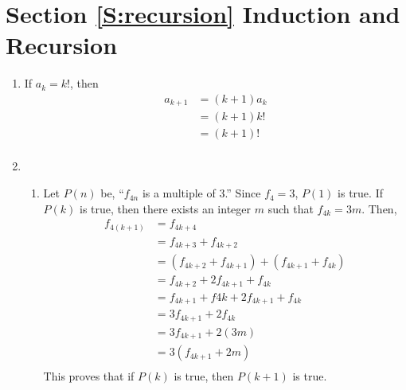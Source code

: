 \section*{Section \ref{S:recursion} Induction and Recursion}

\begin{enumerate}
\item  If  $a_k = k!$, then
\begin{align*}
a_{k+1} &= \left( k + 1 \right)a_k \\
        &= \left( k + 1 \right) k! \\
        &= \left( k + 1 \right)! \\
\end{align*}







\item
\begin{enumerate}
\item Let $P \left( n \right)$ be, ``$f_{4n}$ is a multiple of 3.''  Since $f_4 = 3$, 
$P \left( 1 \right)$ is true.  If $P \left( k \right)$ is true, then there exists an integer $m$ such that $f_{4k} = 3m$.  Then,
\[
\begin{aligned}
f_{4 \left( k + 1 \right)} &= f_{4k + 4} \\
                           &= f_{4k+3} + f_{4k+2} \\
                 &= \left( f_{4k+2} + f_{4k+1} \right) + \left( f_{4k+1} + f_{4k} \right) \\
                 &= f_{4k+2} + 2 f_{4k+1} + f_{4k} \\
                 &= f_{4k+1} + f{4k} + 2 f_{4k+1} + f_{4k} \\
                 &= 3 f_{4k+1} + 2 f_{4k} \\
                 &= 3 f_{4k+1} + 2 \left( 3m \right) \\
                 &= 3 \left( f_{4k+1} + 2m \right) \\
\end{aligned}
\]
This proves that if $P \left( k \right)$ is true, then $P \left( k + 1\right)$ is true.


\end{enumerate}
\end{enumerate}
